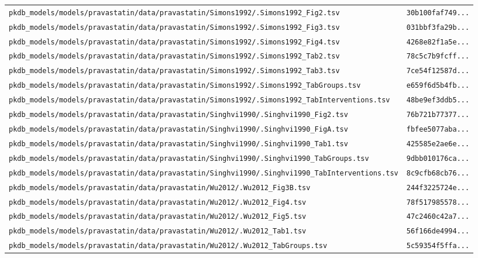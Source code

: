 \begin{longtable}{ll}
\texttt{pkdb\_models/models/pravastatin/data/pravastatin/Simons1992/.Simons1992\_Fig2.tsv} & \texttt{30b100faf749...} \\
\texttt{pkdb\_models/models/pravastatin/data/pravastatin/Simons1992/.Simons1992\_Fig3.tsv} & \texttt{031bbf3fa29b...} \\
\texttt{pkdb\_models/models/pravastatin/data/pravastatin/Simons1992/.Simons1992\_Fig4.tsv} & \texttt{4268e82f1a5e...} \\
\texttt{pkdb\_models/models/pravastatin/data/pravastatin/Simons1992/.Simons1992\_Tab2.tsv} & \texttt{78c5c7b9fcff...} \\
\texttt{pkdb\_models/models/pravastatin/data/pravastatin/Simons1992/.Simons1992\_Tab3.tsv} & \texttt{7ce54f12587d...} \\
\texttt{pkdb\_models/models/pravastatin/data/pravastatin/Simons1992/.Simons1992\_TabGroups.tsv} & \texttt{e659f6d5b4fb...} \\
\texttt{pkdb\_models/models/pravastatin/data/pravastatin/Simons1992/.Simons1992\_TabInterventions.tsv} & \texttt{48be9ef3ddb5...} \\
\texttt{pkdb\_models/models/pravastatin/data/pravastatin/Singhvi1990/.Singhvi1990\_Fig2.tsv} & \texttt{76b721b77377...} \\
\texttt{pkdb\_models/models/pravastatin/data/pravastatin/Singhvi1990/.Singhvi1990\_FigA.tsv} & \texttt{fbfee5077aba...} \\
\texttt{pkdb\_models/models/pravastatin/data/pravastatin/Singhvi1990/.Singhvi1990\_Tab1.tsv} & \texttt{425585e2ae6e...} \\
\texttt{pkdb\_models/models/pravastatin/data/pravastatin/Singhvi1990/.Singhvi1990\_TabGroups.tsv} & \texttt{9dbb010176ca...} \\
\texttt{pkdb\_models/models/pravastatin/data/pravastatin/Singhvi1990/.Singhvi1990\_TabInterventions.tsv} & \texttt{8c9cfb68cb76...} \\
\texttt{pkdb\_models/models/pravastatin/data/pravastatin/Wu2012/.Wu2012\_Fig3B.tsv} & \texttt{244f3225724e...} \\
\texttt{pkdb\_models/models/pravastatin/data/pravastatin/Wu2012/.Wu2012\_Fig4.tsv} & \texttt{78f517985578...} \\
\texttt{pkdb\_models/models/pravastatin/data/pravastatin/Wu2012/.Wu2012\_Fig5.tsv} & \texttt{47c2460c42a7...} \\
\texttt{pkdb\_models/models/pravastatin/data/pravastatin/Wu2012/.Wu2012\_Tab1.tsv} & \texttt{56f166de4994...} \\
\texttt{pkdb\_models/models/pravastatin/data/pravastatin/Wu2012/.Wu2012\_TabGroups.tsv} & \texttt{5c59354f5ffa...} \\

\end{longtable}
